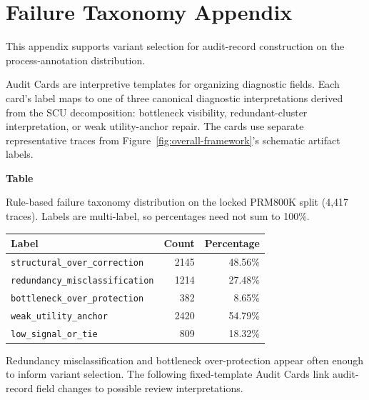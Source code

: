 \documentclass[a4paper,fleqn]{cas-sc}
\begin{document}
\section{Failure Taxonomy Appendix}
\label{app:failure-taxonomy}

This appendix supports variant selection for audit-record construction on the process-annotation distribution.

Audit Cards are interpretive templates for organizing diagnostic fields. Each card's label maps to one of three canonical diagnostic interpretations derived from the SCU decomposition: bottleneck visibility, redundant-cluster interpretation, or weak utility-anchor repair. The cards use separate representative traces from Figure~\ref{fig:overall-framework}'s schematic artifact labels.

\par\medskip
{}\label{tab:failure-taxonomy}
\noindent\textbf{Table~\thetable}\par
\noindent Rule-based failure taxonomy distribution on the locked PRM800K split (4,417 traces). Labels are multi-label, so percentages need not sum to 100\%.
\begin{center}
\small
\renewcommand{\arraystretch}{1.08}
\begin{tabular}{lrr}
\toprule
\textbf{Label} & \textbf{Count} & \textbf{Percentage} \\
\midrule
\texttt{structural\_over\_correction} & 2145 & 48.56\% \\
\texttt{redundancy\_misclassification} & 1214 & 27.48\% \\
\texttt{bottleneck\_over\_protection} & 382 & 8.65\% \\
\texttt{weak\_utility\_anchor} & 2420 & 54.79\% \\
\texttt{low\_signal\_or\_tie} & 809 & 18.32\% \\
\bottomrule
\end{tabular}
\end{center}
\medskip

Redundancy misclassification and bottleneck over-protection appear often enough to inform variant selection. The following fixed-template Audit Cards link audit-record field changes to possible review interpretations.
\end{document}
